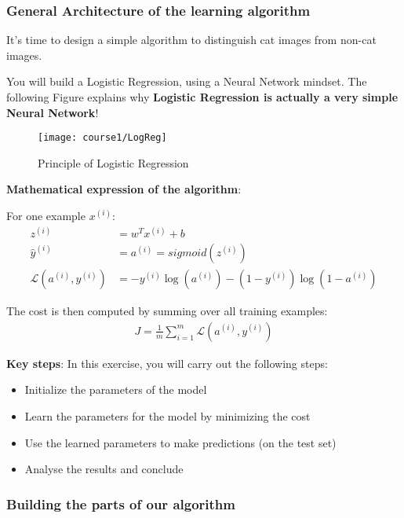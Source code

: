 {{\subsubsection{General Architecture of the learning algorithm}

\indent It's time to design a simple algorithm to distinguish cat images from non-cat images.

You will build a Logistic Regression, using a Neural Network mindset. The following Figure explains why {\textbf {Logistic Regression is actually a very simple Neural Network}}!

\begin{figure}[h]
\begin{center}
\texttt{[image: course1/LogReg]}
\end{center}
\caption{Principle of Logistic Regression }
\label{fig:LogReg}
\end{figure}


{\textbf {Mathematical expression of the algorithm}}:

For one example $x^{(i)}$:
\begin{align}
z^{(i)} &= w^T x^{(i)} + b \\
\hat{y}^{(i)} &= a^{(i)} = sigmoid(z^{(i)})\\
\mathcal{L}(a^{(i)}, y^{(i)}) &=  - y^{(i)}  \log(a^{(i)}) - (1-y^{(i)} )  \log(1-a^{(i)})
\end{align}


The cost is then computed by summing over all training examples:
\begin{align}
J = \frac{1}{m} \sum_{i=1}^m \mathcal{L}(a^{(i)}, y^{(i)})
\end{align}

{\textbf {Key steps}}: In this exercise, you will carry out the following steps:
\begin{itemize}
\item Initialize the parameters of the model
\item Learn the parameters for the model by minimizing the cost  
\item Use the learned parameters to make predictions (on the test set)
\item Analyse the results and conclude
\end{itemize}



\subsubsection{Building the parts of our algorithm}

}}
